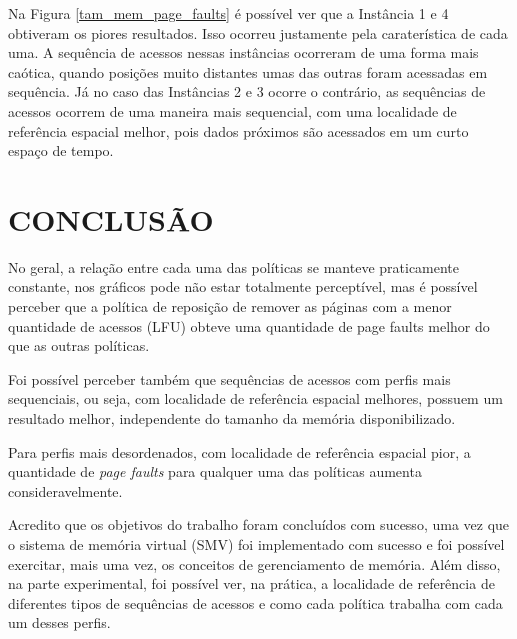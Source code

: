 \documentclass[12pt]{article}
\begin{document}
Na Figura \ref{tam_mem_page_faults} é possível ver que a Instância 1 e 4 obtiveram os piores resultados. Isso ocorreu justamente pela caraterística de cada uma. A sequência de acessos nessas instâncias ocorreram de uma forma mais caótica, quando posições muito distantes umas das outras foram acessadas em sequência. Já no caso das Instâncias 2 e 3 ocorre o contrário, as sequências de acessos ocorrem de uma maneira mais sequencial, com uma localidade de referência espacial melhor, pois dados próximos são acessados em um curto espaço de tempo.


\section{CONCLUSÃO}
\label{conclusao}

No geral, a relação entre cada uma das políticas se manteve praticamente constante, nos gráficos pode não estar totalmente perceptível, mas é possível perceber que a política de reposição de remover as páginas com a menor quantidade de acessos (LFU) obteve uma quantidade de page faults melhor do que as outras políticas.

Foi possível perceber também que sequências de acessos com perfis mais sequenciais, ou seja, com localidade de referência espacial melhores, possuem um resultado melhor, independente do tamanho da memória disponibilizado.

Para perfis mais desordenados, com localidade de referência espacial pior, a quantidade de \textit{page faults} para qualquer uma das políticas aumenta consideravelmente.

Acredito que os objetivos do trabalho foram concluídos com sucesso, uma vez que o sistema de memória virtual (SMV) foi implementado com sucesso e foi possível exercitar, mais uma vez, os conceitos de gerenciamento de memória. Além disso, na parte experimental, foi possível ver, na prática, a localidade de referência de diferentes tipos de sequências de acessos e como cada política trabalha com cada um desses perfis.




\end{document}
